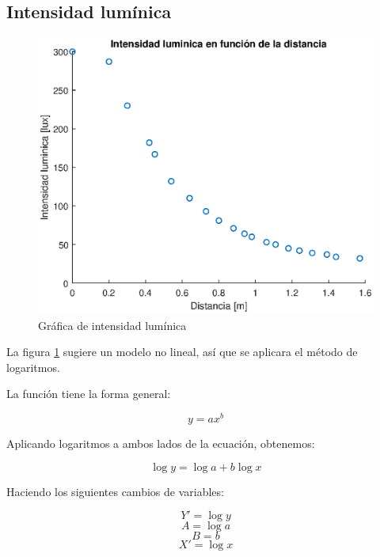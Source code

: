 \documentclass[letter,11pt]{article}
\begin{document}
\subsection{Intensidad lumínica}
\begin{figure}[!h]
\centering
\includegraphics[scale=1.00]{resources/3.1.1.eps}
\caption{Gráfica de intensidad lumínica}
\label{practica41}
\end{figure}

La figura \ref{practica41} sugiere un modelo no lineal, así que se aplicara el
método de logaritmos.

La función tiene la forma general:

\begin{equation*}
    y = a x^b
\end{equation*}

Aplicando logaritmos a ambos lados de la ecuación, obtenemos:

\begin{equation*}
    \log y = \log a + b \log x
\end{equation*}

Haciendo los siguientes cambios de variables:

\begin{equation*}
    Y' = \log y
\end{equation*}
\begin{equation*}
    A = \log a
\end{equation*}
\begin{equation*}
    B = b
\end{equation*}
\begin{equation*}
    X' = \log x
\end{equation*}
\end{document}
